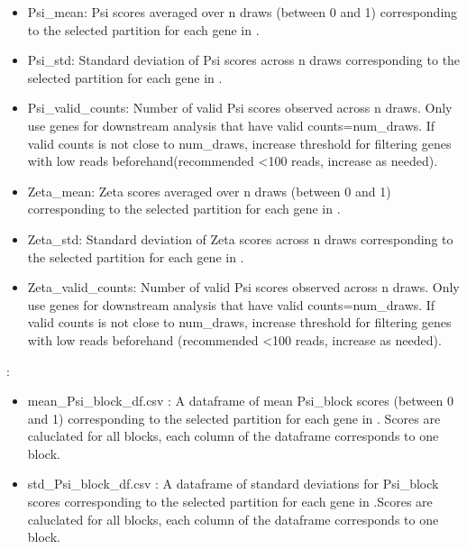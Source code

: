 \documentclass[letterpaper,10pt,english]{sphinxmanual}
\begin{document}
\begin{fulllineitems}
\begin{itemize}
\item {} 
\sphinxAtStartPar
Psi\_mean: Psi scores averaged over n draws (between 0 and 1) corresponding to the selected partition for each gene in .

\item {} 
\sphinxAtStartPar
Psi\_std: Standard deviation of Psi scores across n draws corresponding to the selected partition for each gene in .

\item {} 
\sphinxAtStartPar
Psi\_valid\_counts: Number of valid Psi scores observed across n draws. Only use genes for downstream analysis that have valid counts=num\_draws. If valid counts is not close to num\_draws, increase threshold for filtering genes with low reads beforehand(recommended \textless{}100 reads, increase as needed).

\item {} 
\sphinxAtStartPar
Zeta\_mean: Zeta scores averaged over n draws (between 0 and 1) corresponding to the selected partition for each gene in .

\item {} 
\sphinxAtStartPar
Zeta\_std: Standard deviation of Zeta scores across n draws corresponding to the selected partition for each gene in .

\item {} 
\sphinxAtStartPar
Zeta\_valid\_counts: Number of valid Psi scores observed across n draws. Only use genes for downstream analysis that have valid counts=num\_draws. If valid counts is not close to num\_draws, increase threshold for filtering genes with low reads beforehand (recommended \textless{}100 reads, increase as needed).

\end{itemize}

\sphinxAtStartPar
{}:
\begin{itemize}
\item {} 
\sphinxAtStartPar
mean\_Psi\_block\_df.csv : A dataframe of mean Psi\_block scores (between 0 and 1) corresponding to the selected partition for each gene in . Scores are caluclated for all blocks, each column of the dataframe corresponds to one block.

\item {} 
\sphinxAtStartPar
std\_Psi\_block\_df.csv : A dataframe of standard deviations for Psi\_block scores corresponding to the selected partition for each gene in .Scores are caluclated for all blocks, each column of the dataframe corresponds to one block.


\end{itemize}
\end{fulllineitems}
\end{document}
